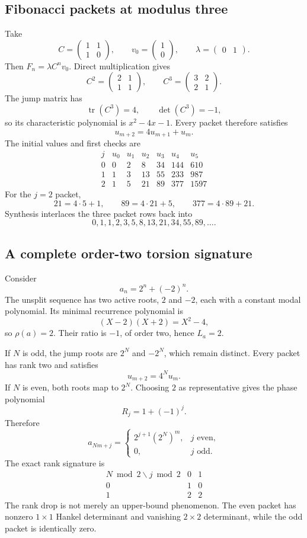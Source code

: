 \documentclass[11pt]{article}
\theoremstyle{definition}\newtheorem{definition}[theorem]{Definition}\newtheorem{example}[theorem]{Example}\newtheorem{construction}[theorem]{Construction}\newtheorem{algorithm}[theorem]{Algorithm}\newtheorem{conjecture}[theorem]{Conjecture}\newtheorem{problem}[theorem]{Problem}
\theoremstyle{remark}\newtheorem{remark}[theorem]{Remark}\newtheorem{boundary}[theorem]{Boundary}\newtheorem{certificate}[theorem]{Computational Certificate}\newtheorem{classical}[theorem]{Classical Input}\newtheorem{principle}[theorem]{Structural Principle}
\begin{document}
\subsection{Fibonacci packets at modulus three}
Take
\[
 C=\begin{pmatrix}1&1\\1&0\end{pmatrix},
 \qquad
 v_0=\begin{pmatrix}1\\0\end{pmatrix},
 \qquad
 \lambda=\begin{pmatrix}0&1\end{pmatrix}.
\]
Then $F_n=\lambda C^nv_0$.  Direct multiplication gives
\[
 C^2=\begin{pmatrix}2&1\\1&1\end{pmatrix},
 \qquad
 C^3=\begin{pmatrix}3&2\\2&1\end{pmatrix}.
\]
The jump matrix has
\[
 \operatorname{tr}(C^3)=4,
 \qquad
 \det(C^3)=-1,
\]
so its characteristic polynomial is $x^2-4x-1$.  Every packet therefore satisfies
\[
 u_{m+2}=4u_{m+1}+u_m.
\]
The initial values and first checks are
\[
\begin{array}{c|rrrrrr}
 j&u_0&u_1&u_2&u_3&u_4&u_5\\
\hline
0&0&2&8&34&144&610\\
1&1&3&13&55&233&987\\
2&1&5&21&89&377&1597
\end{array}
\]
For the $j=2$ packet,
\[
 21=4\cdot5+1,
 \qquad
 89=4\cdot21+5,
 \qquad
 377=4\cdot89+21.
\]
Synthesis interlaces the three packet rows back into
\[
 0,1,1,2,3,5,8,13,21,34,55,89,\ldots.
\]

\subsection{A complete order-two torsion signature}
Consider
\[
 a_n=2^n+(-2)^n.
\]
The unsplit sequence has two active roots, $2$ and $-2$, each with a constant modal polynomial.  Its minimal recurrence polynomial is
\[
 (X-2)(X+2)=X^2-4,
\]
so $\rho(a)=2$.  Their ratio is $-1$, of order two, hence $L_a=2$.

If $N$ is odd, the jump roots are $2^N$ and $-2^N$, which remain distinct.  Every packet has rank two and satisfies
\[
 u_{m+2}=4^Nu_m.
\]
If $N$ is even, both roots map to $2^N$.  Choosing $2$ as representative gives the phase polynomial
\[
 R_j=1+(-1)^j.
\]
Therefore
\[
 a_{Nm+j}=
 \begin{cases}
 2^{j+1}(2^N)^m,&j\text{ even},\\
 0,&j\text{ odd}.
 \end{cases}
\]
The exact rank signature is
\[
\begin{array}{c|cc}
N\bmod2\backslash j\bmod2&0&1\\
\hline
0&1&0\\
1&2&2
\end{array}
\]
The rank drop is not merely an upper-bound phenomenon.  The even packet has nonzero $1\times1$ Hankel determinant and vanishing $2\times2$ determinant, while the odd packet is identically zero.
\end{document}
